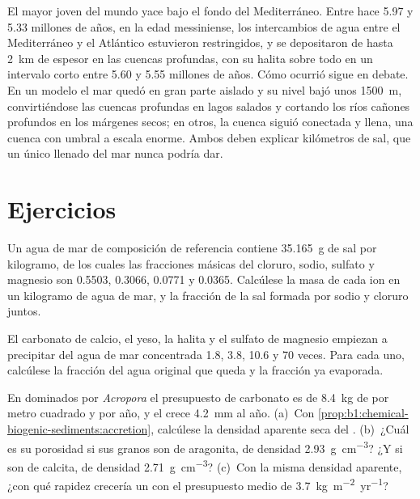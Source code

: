 El mayor  joven del mundo yace bajo el fondo del Mediterráneo. Entre hace 5.97 y 5.33 millones de años, en la edad messiniense, los intercambios de agua entre el Mediterráneo y el Atlántico
estuvieron restringidos, y se depositaron  de hasta \qty{2}{km} de espesor en las cuencas profundas, con su halita sobre todo en un intervalo corto entre 5.60 y 5.55 millones de años.
Cómo ocurrió sigue en debate. En un modelo el mar quedó en gran parte aislado y su nivel bajó unos \qty{1500}{m}, convirtiéndose las cuencas profundas en lagos salados y cortando los ríos cañones
profundos en los márgenes secos; en otros, la cuenca siguió conectada y llena, una cuenca con umbral a escala enorme. Ambos deben explicar kilómetros de sal, que un único llenado del mar nunca podría dar.

\section{Ejercicios}

\begin{exercise}[$\star$]\label{exo:b1:chemical-biogenic-sediments:1}
Un agua de mar de composición de referencia contiene \qty{35.165}{g} de sal por kilogramo, de los cuales las fracciones másicas del cloruro, sodio, sulfato y magnesio son
0.5503, 0.3066, 0.0771 y 0.0365. Calcúlese la masa de cada ion en un kilogramo de agua de mar, y la fracción de la sal formada por sodio y cloruro juntos.
\end{exercise}

\begin{exercise}[$\star$]\label{exo:b1:chemical-biogenic-sediments:2}
El carbonato de calcio, el yeso, la halita y el sulfato de magnesio empiezan a precipitar del agua de mar concentrada 1.8, 3.8, 10.6 y 70 veces. Para cada uno, calcúlese la fracción del agua
original que queda y la fracción ya evaporada.
\end{exercise}

\begin{exercise}[$\star$]\label{exo:b1:chemical-biogenic-sediments:3}
En  dominados por \emph{Acropora} el presupuesto de carbonato es de \qty{8.4}{kg} de  por metro cuadrado y por año, y el  crece \qty{4.2}{mm} al año. (a)~Con
\cref{prop:b1:chemical-biogenic-sediments:accretion}, calcúlese la densidad aparente seca del . (b)~¿Cuál es su porosidad si sus granos son de aragonita, de densidad \qty{2.93}{g.cm^{-3}}?
¿Y si son de calcita, de densidad \qty{2.71}{g.cm^{-3}}? (c)~Con la misma densidad aparente, ¿con qué rapidez crecería un  con el presupuesto medio de \qty{3.7}{kg.m^{-2}.yr^{-1}}?
\end{exercise}

